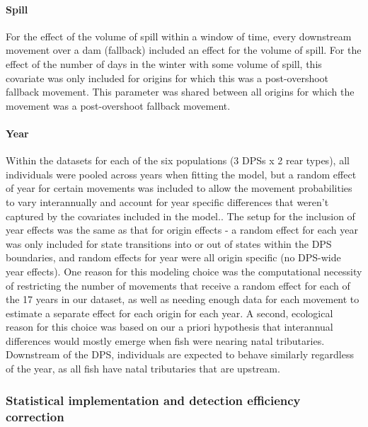 \documentclass[
  12pt,
]{report}
\begin{document}
\hypertarget{spill}{%
\paragraph{Spill}\label{spill}}

For the effect of the volume of spill within a window of time, every
downstream movement over a dam (fallback) included an effect for the
volume of spill. For the effect of the number of days in the winter with
some volume of spill, this covariate was only included for origins for
which this was a post-overshoot fallback movement. This parameter was
shared between all origins for which the movement was a post-overshoot
fallback movement.

\hypertarget{year}{%
\paragraph{Year}\label{year}}

Within the datasets for each of the six populations (3 DPSs x 2 rear
types), all individuals were pooled across years when fitting the model,
but a random effect of year for certain movements was included to allow
the movement probabilities to vary interannually and account for year
specific differences that weren't captured by the covariates included in
the model.. The setup for the inclusion of year effects was the same as
that for origin effects - a random effect for each year was only
included for state transitions into or out of states within the DPS
boundaries, and random effects for year were all origin specific (no
DPS-wide year effects). One reason for this modeling choice was the
computational necessity of restricting the number of movements that
receive a random effect for each of the 17 years in our dataset, as well
as needing enough data for each movement to estimate a separate effect
for each origin for each year. A second, ecological reason for this
choice was based on our a priori hypothesis that interannual differences
would mostly emerge when fish were nearing natal tributaries. Downstream
of the DPS, individuals are expected to behave similarly regardless of
the year, as all fish have natal tributaries that are upstream.

\hypertarget{statistical-implementation-and-detection-efficiency-correction}{%
\subsubsection{Statistical implementation and detection efficiency
correction}\label{statistical-implementation-and-detection-efficiency-correction}}
\end{document}

